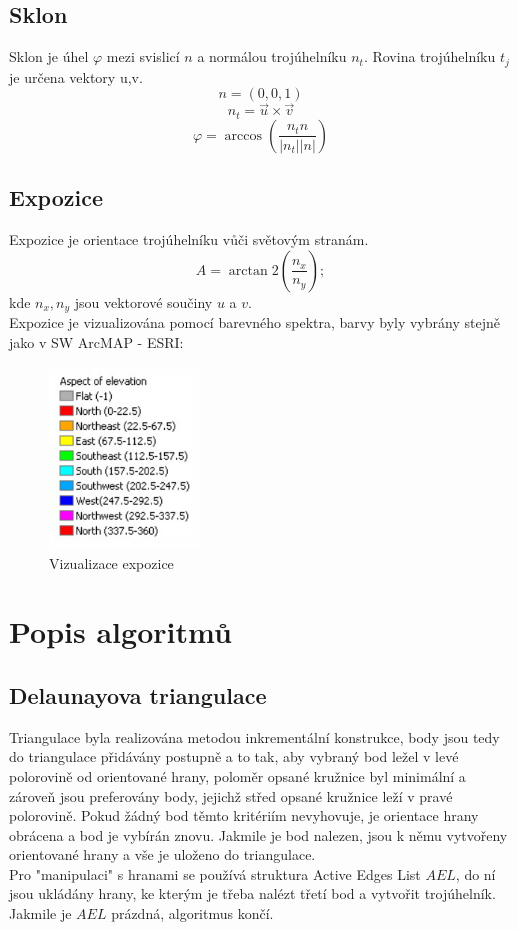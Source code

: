 \documentclass[a4paper, 12pt]{article}
\begin{document}
\subsection{Sklon}

Sklon je úhel $\varphi$ mezi svislicí $n$ a normálou trojúhelníku $n_t$. Rovina trojúhelníku $t_j$ je určena vektory u,v.\\

\noindent$$n = (0,0,1)$$
$$n_t = \vec{u}\times \vec{v}$$
$$\varphi =\arccos(\frac{n_t  n}{|n_t| |n|})$$



\subsection{Expozice}
Expozice je orientace trojúhelníku vůči světovým stranám.\\
$$A = \arctan2(\frac{n_x}{n_y});$$ kde $n_x, n_y$ jsou vektorové součiny $u$ a $v$.\\

\noindent Expozice je vizualizována pomocí barevného spektra, barvy byly vybrány stejně jako v SW ArcMAP - ESRI:\\
\begin{figure}[h]
	\centering
	\includegraphics[width=4cm]{expozice.jpg}
	\caption{Vizualizace expozice}
\end{figure}


\clearpage
\section{Popis algoritmů}

\subsection{Delaunayova triangulace}
Triangulace byla realizována metodou inkrementální konstrukce, body jsou tedy do triangulace přidávány postupně a to tak, aby vybraný bod ležel v levé polorovině od orientované hrany, poloměr opsané kružnice byl minimální a zároveň jsou preferovány body, jejichž střed opsané kružnice leží v pravé polorovině. Pokud žádný bod těmto kritériím nevyhovuje, je orientace hrany obrácena a bod je vybírán znovu. Jakmile je bod nalezen, jsou k němu vytvořeny orientované hrany a vše je uloženo do triangulace.\\
Pro "manipulaci" s hranami se používá struktura Active Edges List $AEL$, do ní jsou ukládány hrany, ke kterým je třeba nalézt třetí bod a vytvořit trojúhelník. Jakmile je $AEL$ prázdná, algoritmus končí.
\end{document}
